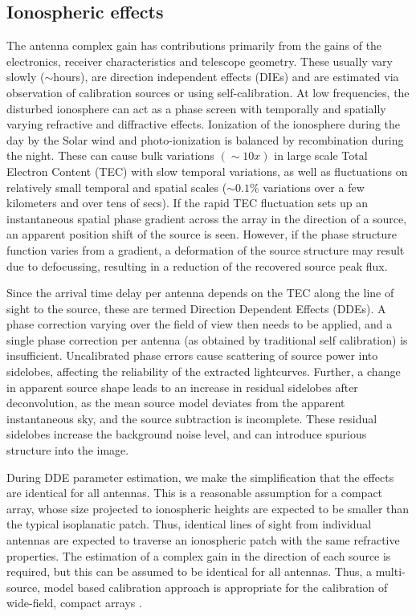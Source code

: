 \documentclass{aa}
\begin{document}
\subsection{\label{sub:All-Sky-cal-iono}Ionospheric effects}

The  antenna complex  gain has  contributions primarily  from the  gains  of the
electronics, receiver characteristics and telescope geometry. These usually vary
slowly ($\sim$hours), are direction independent effects (DIEs) and are estimated
via  observation  of calibration  sources  or  using  self-calibration.  At  low
frequencies, the disturbed ionosphere can  act as a phase screen with temporally
and  spatially varying refractive  and diffractive  effects.  Ionization  of the
ionosphere during the day by the  Solar wind and photo-ionization is balanced by
recombination   during   the   night.    These   can   cause   bulk   variations
$\left(\sim10x\right)$  in large scale  Total Electron  Content (TEC)  with slow
temporal variations,  as well as  fluctuations on relatively small  temporal and
spatial scales  ($\sim0.1\%$ variations over a  few kilometers and  over tens of
secs).   If the rapid  TEC fluctuation  sets up  an instantaneous  spatial phase
gradient across  the array in  the direction of  a source, an  apparent position
shift of  the source is seen.   However, if the phase  structure function varies
from  a gradient,  a  deformation of  the  source structure  may  result due  to
defocussing, resulting in a reduction of the recovered source peak flux.

Since the arrival  time delay per antenna  depends on the TEC along  the line of
sight  to the source,  these are  termed Direction  Dependent Effects  (DDEs). A
phase correction varying over the field of  view then needs to be applied, and a
single  phase   correction  per  antenna   (as  obtained  by   traditional  self
calibration)  is insufficient.   Uncalibrated phase  errors cause  scattering of
source  power  into  sidelobes,  affecting  the  reliability  of  the  extracted
lightcurves.  Further, a change in apparent source shape leads to an increase in
residual sidelobes after  deconvolution, as the mean source  model deviates from
the apparent instantaneous sky, and  the source subtraction is incomplete. These
residual  sidelobes  increase the  background  noise  level,  and can  introduce
spurious structure into the image.


During DDE parameter estimation, we make the simplification that the effects are
identical  for all  antennas.  This  is a  reasonable assumption  for  a compact
array, whose  size projected to ionospheric  heights are expected  to be smaller
than  the  typical  isoplanatic  patch.  Thus, identical  lines  of  sight  from
individual antennas are expected to  traverse an ionospheric patch with the same
refractive properties. The estimation of a complex gain in the direction of each
source  is  required,  but  this  can   be  assumed  to  be  identical  for  all
antennas. Thus, a multi-source,  model based calibration approach is appropriate
for      the      calibration       of      wide-field,      compact      arrays
\citep{wijnholds2010calibration}.
\end{document}
